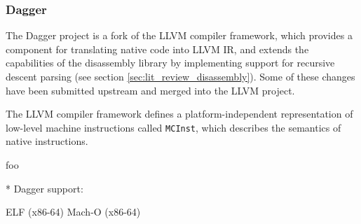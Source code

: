 
\subsubsection{Dagger}

The Dagger project is a fork of the LLVM compiler framework, which provides a component for translating native code into LLVM IR, and extends the capabilities of the disassembly library by implementing support for recursive descent parsing (see section \ref{sec:lit_review_disassembly}). Some of these changes have been submitted upstream and merged into the LLVM project.

The LLVM compiler framework defines a platform-independent representation of low-level machine instructions called \texttt{MCInst}, which describes the semantics of native instructions.


foo



* Dagger support:

ELF (x86-64)
Mach-O (x86-64)

